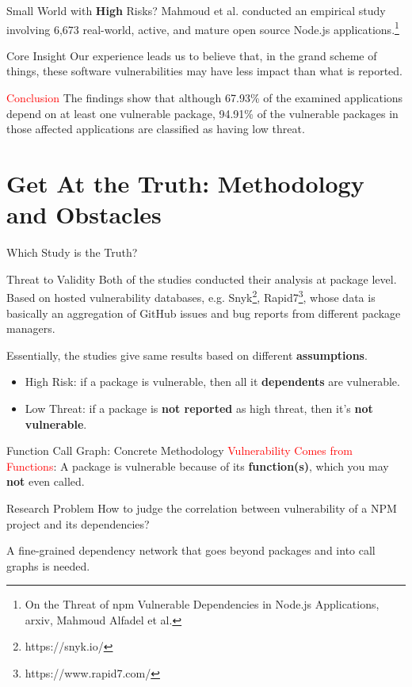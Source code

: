 \documentclass{beamer}
\begin{document}
\begin{frame}{Small World with \textbf{High} Risks?}
Mahmoud et al. conducted an empirical study involving 6,673 real-world, active, and mature open source Node.js applications.\footnote{On the Threat of npm Vulnerable Dependencies in Node.js Applications, arxiv, Mahmoud Alfadel et al.}
\begin{alertblock}{Core Insight}
Our experience leads us to believe that, in the grand scheme of things, these software vulnerabilities may have less impact than what is reported.
\end{alertblock}
\textcolor{red}{Conclusion}
The findings show that although 67.93\% of the examined applications
depend on at least one vulnerable package, 94.91\% of the vulnerable packages in those affected applications are classified as having
low threat. 
\end{frame}

\section{Get At the Truth: Methodology and Obstacles}
\begin{frame}{Which Study is the Truth?}
\begin{alertblock}{Threat to Validity}
Both of the studies conducted their analysis at package level. Based on hosted vulnerability databases, e.g. Snyk\footnote{https://snyk.io/}, Rapid7\footnote{https://www.rapid7.com/}, whose data is basically an aggregation of GitHub issues and bug reports from different package managers. 
\end{alertblock}
\pause
Essentially, the studies give same results based on different \textbf{assumptions}.
\begin{itemize}
    \item High Risk: if a package is vulnerable, then all it \textbf{dependents} are vulnerable.
    \item Low Threat: if a package is \textbf{not reported} as high threat, then it's \textbf{not vulnerable}.
\end{itemize}
\end{frame}



\begin{frame}{Function Call Graph: Concrete Methodology}
\textcolor{red}{Vulnerability Comes from Functions}: A package is vulnerable because of its \textbf{function(s)}, which you may \textbf{not} even called. 
\begin{alertblock}{Research Problem}
How to judge the correlation between vulnerability of a NPM project and its dependencies?
\end{alertblock}
A fine-grained dependency network that goes beyond packages and into call graphs is needed.
\end{frame}
\end{document}
